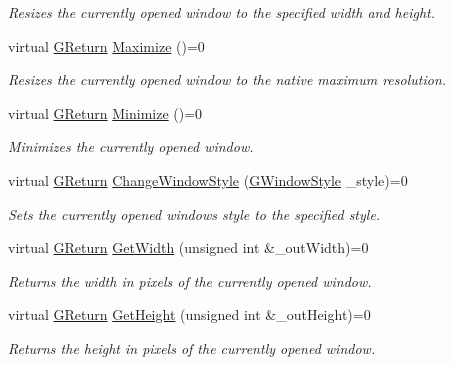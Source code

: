\begin{DoxyCompactItemize}
\begin{DoxyCompactList}\small\item\em Resizes the currently opened window to the specified width and height. \end{DoxyCompactList}\item 
virtual \mbox{\hyperlink{namespaceGW_a67a839e3df7ea8a5c5686613a7a3de21}{G\+Return}} \mbox{\hyperlink{classGW_1_1SYSTEM_1_1GWindow_a06b5f092e742baca82a0bfc2cbaef153}{Maximize}} ()=0
\begin{DoxyCompactList}\small\item\em Resizes the currently opened window to the native maximum resolution. \end{DoxyCompactList}\item 
virtual \mbox{\hyperlink{namespaceGW_a67a839e3df7ea8a5c5686613a7a3de21}{G\+Return}} \mbox{\hyperlink{classGW_1_1SYSTEM_1_1GWindow_a2cced61a323dac10535904c3899563d8}{Minimize}} ()=0
\begin{DoxyCompactList}\small\item\em Minimizes the currently opened window. \end{DoxyCompactList}\item 
virtual \mbox{\hyperlink{namespaceGW_a67a839e3df7ea8a5c5686613a7a3de21}{G\+Return}} \mbox{\hyperlink{classGW_1_1SYSTEM_1_1GWindow_a21533c58e920d347c377ebdaa6d2b76f}{Change\+Window\+Style}} (\mbox{\hyperlink{namespaceGW_1_1SYSTEM_ad117891e556631f842625c348d36a071}{G\+Window\+Style}} \+\_\+style)=0
\begin{DoxyCompactList}\small\item\em Sets the currently opened window\textquotesingle{}s style to the specified style. \end{DoxyCompactList}\item 
virtual \mbox{\hyperlink{namespaceGW_a67a839e3df7ea8a5c5686613a7a3de21}{G\+Return}} \mbox{\hyperlink{classGW_1_1SYSTEM_1_1GWindow_a75672fb359ee44c5e551ee6223a10bdb}{Get\+Width}} (unsigned int \&\+\_\+out\+Width)=0
\begin{DoxyCompactList}\small\item\em Returns the width in pixels of the currently opened window. \end{DoxyCompactList}\item 
virtual \mbox{\hyperlink{namespaceGW_a67a839e3df7ea8a5c5686613a7a3de21}{G\+Return}} \mbox{\hyperlink{classGW_1_1SYSTEM_1_1GWindow_aab8f7e74d8554f309a7785216ff89ff3}{Get\+Height}} (unsigned int \&\+\_\+out\+Height)=0
\begin{DoxyCompactList}\small\item\em Returns the height in pixels of the currently opened window. \end{DoxyCompactList}\item 

\end{DoxyCompactItemize}
